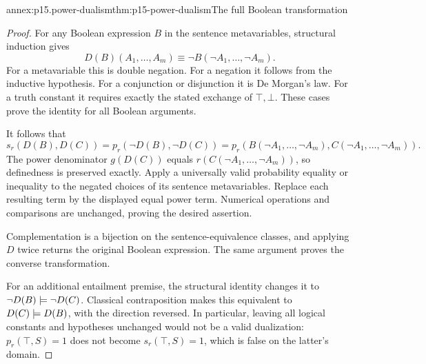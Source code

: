 \begin{annexitem}{annex:p15.power-dualism}{thm:p15-power-dualism}{The full Boolean transformation}
\begin{proof}
For any Boolean expression \(B\)
in the sentence metavariables,
structural induction gives
\[
 D(B)(A_1,\ldots,A_m)
       \equiv\neg B(\neg A_1,\ldots,\neg A_m).
\]
For a metavariable this
is double negation.
For a negation it
follows from the
inductive hypothesis.
For a conjunction or
disjunction it is
De Morgan's law.
For a truth constant
it requires exactly
the stated exchange
of \(\top,\bot\).
These cases prove
the identity for all
Boolean arguments.

It follows that
\[
 s_r(D(B),D(C))
 =p_r(\neg D(B),\neg D(C))
 =p_r(B(\neg A_1,\ldots,\neg A_m),
      C(\neg A_1,\ldots,\neg A_m)).
\]
The power denominator
\(g(D(C))\) equals
\(r(C(\neg A_1,\ldots,\neg A_m))\),
so definedness is
preserved exactly.
Apply a universally
valid probability
equality or inequality
to the negated choices
of its sentence
metavariables. Replace
each resulting term
by the displayed
equal power term.
Numerical operations
and comparisons
are unchanged, proving
the desired assertion.

Complementation is
a bijection on the
sentence-equivalence
classes, and applying
\(D\) twice returns
the original Boolean
expression. The same
argument proves the
converse transformation.

For an additional
entailment premise,
the structural identity
changes it to
\(\neg D(B)\models\neg D(C)\).
Classical contraposition
makes this equivalent
to \(D(C)\models D(B)\),
with the direction
reversed. In particular,
leaving all logical
constants and hypotheses
unchanged would not
be a valid dualization:
\(p_r(\top,S)=1\)
does not become
\(s_r(\top,S)=1\),
which is false on
the latter's domain.
\end{proof}
\end{annexitem}

